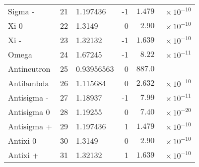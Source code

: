 \begin{center}
\begin{tabular}{|l|r|l|r|r@{}l|}
Sigma -      &21 &1.197436      & -1  & $1.479 $ & $\: \times  10^{-10}$   \\
Xi 0         &22 &1.3149        &  0  & $2.90 $ & $\: \times  10^{-10}$   \\
Xi -         &23 &1.32132       & -1  & $1.639 $ & $\: \times 10^{-10}$   \\
Omega        &24 &1.67245       & -1  & $ 8.22 $ & $\: \times 10^{-11}$   \\
Antineutron  &25 &0.93956563    &  0  & $ 887.0 $  &           \\
Antilambda   &26 &1.115684      &  0  &  $ 2.632 $ & $\: \times 10^{-10}$  \\
Antisigma -  &27 &1.18937       & -1  &  $ 7.99 $ & $\: \times 10^{-11}$   \\
Antisigma 0  &28 &1.19255       &  0  &  $ 7.40 $ & $\: \times  10^{-20}$   \\
Antisigma +  &29 &1.197436      &  1  &  $ 1.479 $ & $\: \times 10^{-10}$   \\
Antixi 0     &30 &1.3149        &  0  &  $ 2.90 $ & $\: \times   10^{-10}$   \\
Antixi +     &31 &1.32132       &  1  &  $ 1.639 $ & $\: \times 10^{-10}$  \\
\hline
\end{tabular}
\end{center}
\newpage
